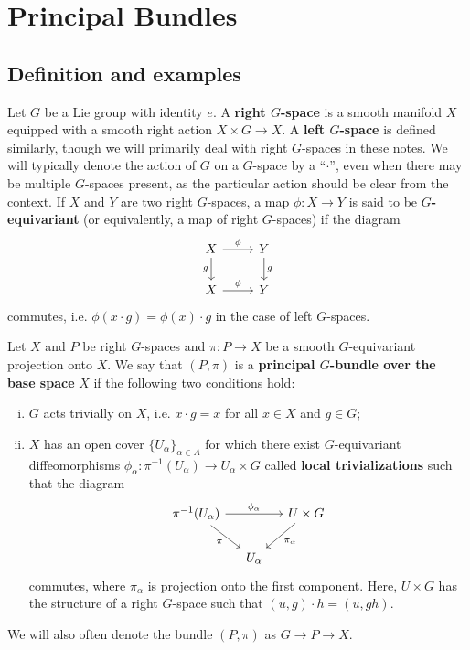 \chapter{Principal Bundles}

\section{Definition and examples}

Let $G$ be a Lie group with identity $e$. A \textbf{right $G$-space} is a smooth manifold $X$ equipped with a smooth right action $X\times G\to X$. 
A \textbf{left $G$-space} is defined similarly, though we will primarily deal with right $G$-spaces in these notes.
We will typically denote the action of $G$ on a $G$-space by a ``$\cdot$'', even when there may
be multiple $G$-spaces present, as the particular action should be clear from the context.
If $X$ and $Y$ are two right $G$-spaces, a map $\phi:X\to Y$ is said to be \textbf{$G$-equivariant} (or equivalently, a map of right $G$-spaces) if the diagram
\[\begin{tikzcd}
        X\arrow[swap]{d}{g}\arrow{r}{\phi}&Y\arrow{d}{g}\\
        X\arrow{r}{\phi}&Y
\end{tikzcd}\]
commutes, i.e. $\phi(x\cdot g)=\phi(x)\cdot g$ in the case of left $G$-spaces.

\begin{defn}
    Let $X$ and $P$ be right $G$-spaces and $\pi: P\to X$ be a smooth $G$-equivariant projection onto $X$.
    We say that $(P,\pi)$ is a \textbf{principal $G$-bundle over the base space} $X$ if the following two conditions hold:
    \begin{enumerate}[(i)]
        \item $G$ acts trivially on $X$, i.e. $x\cdot g=x$ for all $x\in X$ and $g\in G$;
        \item $X$ has an open cover $\{U_\alpha\}_{\alpha\in A}$ for which there exist $G$-equivariant diffeomorphisms $\phi_\alpha:\pi^{-1}(U_\alpha)\to U_\alpha\times G$ called \textbf{local trivializations} such that the diagram
            \[\begin{tikzcd}[column sep=small]
                \pi^{-1}(U_\alpha)\arrow[swap]{dr}{\pi}\arrow{rr}{\phi_\alpha}&&U\times G\arrow{dl}{\pi_\alpha}\\
                &U_\alpha&
            \end{tikzcd}\]
            commutes, where $\pi_\alpha$ is projection onto the first component. Here, $U\times G$ has the structure of a right $G$-space such that $(u,g)\cdot h=(u,gh)$.
    \end{enumerate}
    We will also often denote the bundle $(P,\pi)$ as $G\to P\to X$.
\end{defn}

